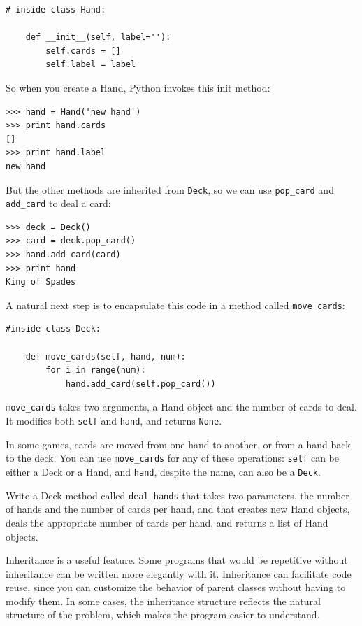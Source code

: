 \documentclass[10pt]{book}
\begin{document}
\begin{CJK}{UTF8}{gbsn}
\begin{verbatim}
# inside class Hand:

    def __init__(self, label=''):
        self.cards = []
        self.label = label
\end{verbatim}
%
So when you create a Hand, Python invokes this init method:

\begin{verbatim}
>>> hand = Hand('new hand')
>>> print hand.cards
[]
>>> print hand.label
new hand
\end{verbatim}
%
But the other methods are inherited from {\tt Deck}, so we can use
\verb"pop_card" and \verb"add_card" to deal a card:

\begin{verbatim}
>>> deck = Deck()
>>> card = deck.pop_card()
>>> hand.add_card(card)
>>> print hand
King of Spades
\end{verbatim}
%
A natural next step is to encapsulate this code in a method
called \verb"move_cards":

\begin{verbatim}
#inside class Deck:

    def move_cards(self, hand, num):
        for i in range(num):
            hand.add_card(self.pop_card())
\end{verbatim}
%
\verb"move_cards" takes two arguments, a Hand object and the number of
cards to deal.  It modifies both {\tt self} and {\tt hand}, and
returns {\tt None}.

In some games, cards are moved from one hand to another,
or from a hand back to the deck.  You can use \verb"move_cards"
for any of these operations: {\tt self} can be either a Deck
or a Hand, and {\tt hand}, despite the name, can also be a {\tt Deck}.

\begin{exercise}

Write a Deck method called \verb"deal_hands" that takes two
parameters, the number of hands and the number of cards per
hand, and that creates new Hand objects, deals the appropriate
number of cards per hand, and returns a list of Hand objects.

\end{exercise}

Inheritance is a useful feature.  Some programs that would be
repetitive without inheritance can be written more elegantly
with it.  Inheritance can facilitate code reuse, since you can
customize the behavior of parent classes without having to modify
them.  In some cases, the inheritance structure reflects the natural
structure of the problem, which makes the program easier to
understand.


\end{CJK}
\end{document}
